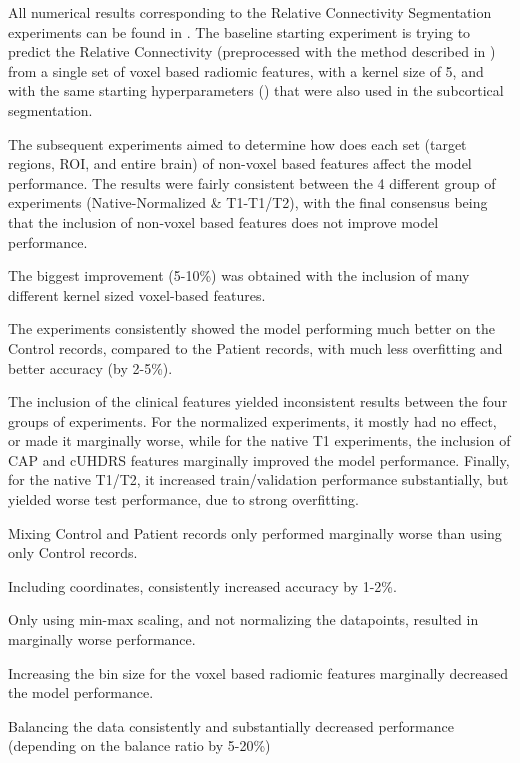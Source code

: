 All numerical results corresponding to the Relative Connectivity Segmentation experiments can be found in  .
The baseline starting experiment is trying to predict the Relative Connectivity (preprocessed with the method described in ) from a single set of voxel based radiomic features, with a kernel size of 5, and with the same starting hyperparameters () that were also used in the subcortical segmentation.\par
The subsequent experiments aimed to determine how does each set (target regions, \ac{ROI}, and entire brain) of non-voxel based features affect the model performance. The results were fairly consistent between the 4 different group of experiments (Native-Normalized & T1-T1/T2), with the final consensus being that the inclusion of non-voxel based features does not improve model performance.\par
The biggest improvement (5-10\%) was obtained with the inclusion of many different kernel sized voxel-based features.\par
The experiments consistently showed the model performing much better on the Control records, compared to the Patient records, with much less overfitting and better accuracy (by 2-5\%).\par
The inclusion of the clinical features yielded inconsistent results between the four groups of experiments. For the normalized experiments, it mostly had no effect, or made it marginally worse, while for the native T1 experiments, the inclusion of \ac{CAP} and \ac{cUHDRS} features marginally improved the model performance. Finally, for the native T1/T2, it increased train/validation performance substantially, but yielded worse test performance, due to strong overfitting.\par
Mixing Control and Patient records only performed marginally worse than using only Control records.\par
Including coordinates, consistently increased accuracy by 1-2\%.\par
Only using min-max scaling, and not normalizing the datapoints, resulted in marginally worse performance.\par
Increasing the bin size for the voxel based radiomic features marginally decreased the model performance.\par
Balancing the data consistently and substantially decreased performance (depending on the balance ratio by 5-20\%)\par
